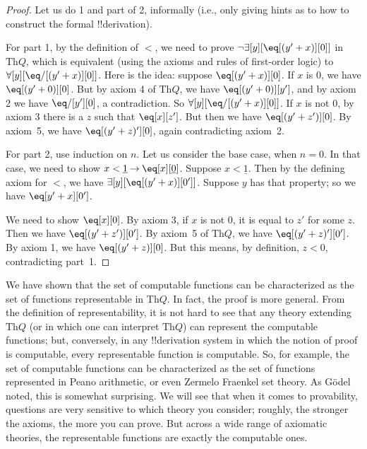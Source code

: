 \documentclass[10pt,a4paper]{article}
\theoremstyle{plain}
\theoremstyle{definition}
\theoremstyle{remark}
\newenvironment{explain}{}{}
\providecommand{\lif}{\mathbin{\rightarrow}}
\providecommand{\lforall}{\mathord{\forall}}
\providecommand{\lexists}{\mathord{\exists}}
\providecommand{\Th}{\ensuremath{\mathrm{Th}}}
\providecommand{\num}[1]{\underline{#1}}
\begin{document}
\begin{proof}
Let us do 1 and part of 2, informally (i.e., only giving hints as to
how to construct the formal !!{derivation}).

For part 1, by the definition of $<$, we need to prove $\lnot
\lexists[y][\eq[(y'+x)][0]]$ in $\Th{Q}$, which is equivalent (using
the axioms and rules of first-order logic) to $\lforall[y][\eq/[(y' +
    x)][0]]$. Here is the idea: suppose $\eq[(y'+x)][0]$. If $x$ is 0,
we have $\eq[(y' + 0)][0]$. But by axiom 4 of $\Th{Q}$, we have
$\eq[(y' + 0)][y']$, and by axiom 2 we have $\eq/[y'][0]$, a
contradiction. So $\lforall[y][\eq/[(y' +x)][0]]$. If $x$ is not $0$,
by axiom 3 there is a $z$ such that $\eq[x][z']$. But then we have
$\eq[(y' + z')][0]$. By axiom~5, we have $\eq[(y' + z)'][0]$, again
contradicting axiom~2.

For part 2, use induction on $n$. Let us consider the base case, when
$n =0$. In that case, we need to show $x < \num 1 \lif \eq[x][\num
  0]$. Suppose $x < \num 1$. Then by the defining axiom for $<$, we
have $\lexists[y][\eq[(y'+x)][0']]$. Suppose $y$ has that property; so
we have $\eq[y'+x][0']$.

We need to show $\eq[x][0]$. By axiom 3, if $x$ is not 0, it is equal
to $z'$ for some $z$. Then we have $\eq[(y' + z')][0']$. By axiom~5 of
  $\Th{Q}$, we have $\eq[(y'+z)'][0']$. By axiom 1, we have $\eq[(y' +
    z)][0]$. But this means, by definition, $z < 0$, contradicting
  part~1.
\end{proof}

\begin{explain}
We have shown that the set of computable functions can be
characterized as the set of functions representable in $\Th{Q}$. In fact,
the proof is more general. From the definition of representability, it
is not hard to see that any theory extending $\Th{Q}$ (or in which one can
interpret $\Th{Q}$) can represent the computable functions; but,
conversely, in any !!{derivation} system in which the notion of proof is
computable, every representable function is computable. So, for
example, the set of computable functions can be characterized as the
set of functions represented in Peano arithmetic, or even Zermelo
Fraenkel set theory. As G\"odel noted, this is somewhat surprising.
We will see that when it comes to provability, questions are very
sensitive to which theory you consider; roughly, the stronger the
axioms, the more you can prove. But across a wide range of axiomatic
theories, the representable functions are exactly the computable ones.
\end{explain}
\end{document}
